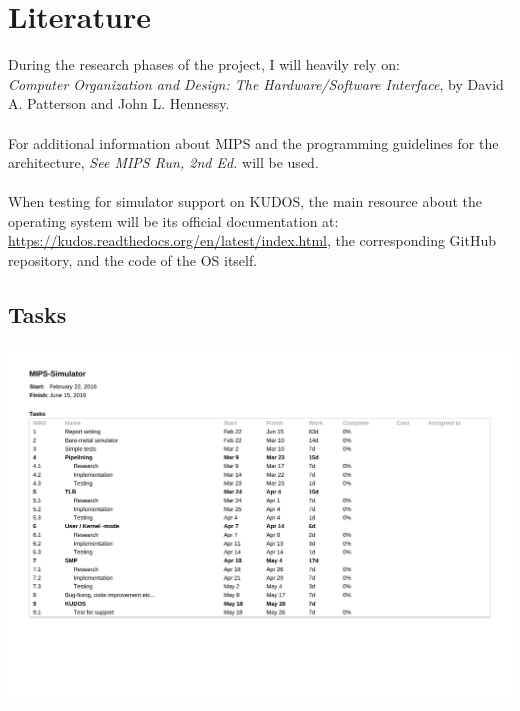 \documentclass[11pt]{article}
\begin{document}
\section{Literature}
During the research phases of the project, I will heavily rely on:\\
 \textit{Computer Organization and Design: The Hardware/Software Interface},
 by David A. Patterson and John L. Hennessy.\\\\
For additional information about MIPS and the programming guidelines for
the architecture, \textit{See MIPS Run, 2nd Ed.} will be used.\\\\
When testing for simulator support on KUDOS, the main resource
about the operating system will be its official documentation at:
\url{https://kudos.readthedocs.org/en/latest/index.html}, the corresponding
GitHub repository, and the code of the OS itself.

\newpage
\appendix
\begin{appendices}
\section{Tasks}
\label{appendix:Tasks}
\includegraphics[scale=0.8,angle=270]{tasks.pdf}
%
\end{appendices}
\end{document}
